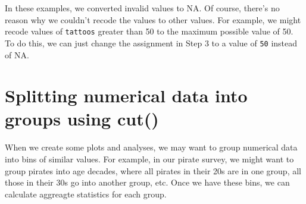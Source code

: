 \documentclass{tufte-book}\usepackage[]{graphicx}\usepackage[]{color}
\makeatletter
\newcommand{\hlstr}[1]{\textcolor[rgb]{0.192,0.494,0.8}{#1}}%
\newcommand{\hlopt}[1]{\textcolor[rgb]{0,0,0}{#1}}%
\newcommand{\hlstd}[1]{\textcolor[rgb]{0.345,0.345,0.345}{#1}}%
\newcommand{\hlkwc}[1]{\textcolor[rgb]{0.333,0.667,0.333}{#1}}%
\newcommand{\hlkwd}[1]{\textcolor[rgb]{0.737,0.353,0.396}{\textbf{#1}}}%
\newenvironment{kframe}{%
 \def\at@end@of@kframe{}%
 \ifinner\ifhmode%
  \def\at@end@of@kframe{\end{minipage}}%
  \begin{minipage}{\columnwidth}%
 \fi\fi%
 \def\FrameCommand##1{\hskip\@totalleftmargin \hskip-\fboxsep
 \colorbox{shadecolor}{##1}\hskip-\fboxsep
     \hskip-\linewidth \hskip-\@totalleftmargin \hskip\columnwidth}%
 \MakeFramed {\advance\hsize-\width
   \@totalleftmargin\z@ \linewidth\hsize
   \@setminipage}}%
 {\par\unskip\endMakeFramed%
 \at@end@of@kframe}
\newenvironment{knitrout}{}{} %
\makeatother
\begin{document}
\begin{footnotesize}

In these examples, we converted invalid values to NA. Of course, there's no reason why we couldn't recode the values to other values. For example, we might recode values of \texttt{tattoos} greater than 50 to the maximum possible value of 50. To do this, we can just change the assignment in Step 3 to a value of \texttt{50} instead of NA.


\section{Splitting numerical data into groups using cut()}

When we create some plots and analyses, we may want to group numerical data into bins of similar values. For example, in our pirate survey, we might want to group pirates into age decades, where all pirates in their 20s are in one group, all those in their 30s go into another group, etc. Once we have these bins, we can calculate aggreagte statistics for each group.


\end{footnotesize}
\end{document}

